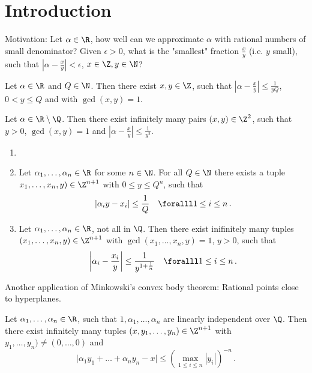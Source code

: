 \section{Introduction}

Motivation: Let \( \alpha \in \R \), how well can we approximate \( \alpha \) with rational numbers of small denominator?
Given \( \epsilon>0 \), what is the "smallest" fraction \( \frac{x}{y} \) (i.e. \( y \) small), such that \( \left| \alpha - \frac{x}{y} \right| < \epsilon \), \( x \in \Z, y \in \N \)?

\begin{thmn}[Dirichlet, 1842]
	Let \( \alpha \in \R \) and \( Q \in \N \).
	Then there exist \( x,y \in \Z \), such that \( \left| \alpha - \frac{x}{y} \right| \leq \frac{1}{yQ} \), \( 0 < y \leq Q \) and with \( \gcd(x,y) = 1 \).
\end{thmn}

\begin{cor}\label{thm:4.2}
	Let \( \alpha \in \R \setminus \Q \).
	Then there exist infinitely many pairs \( (x,y) \in \Z^2 \), such that \( y > 0 \), \( \gcd(x,y)=1 \) and \( \left| \alpha - \frac{x}{y} \right| \leq \frac{1}{y^2} \).
\end{cor}

\begin{thmn}[Dirichlet, 1842]
	\begin{enumerate}[label=(\alph*)]
		\item[]
		\item Let \( \alpha_1, \dotsc, \alpha_n \in \R \) for some \( n \in \N \).
			For all \( Q \in \N \) there exists a tuple \( x_1, \dotsc, x_n, y) \in \Z^{n+1} \) with \( 0 \leq y \leq Q^n \), such that
			\[ \left| \alpha_i y - x_i \right| \leq \frac{1}{Q} \quad \foralll 1 \leq i \leq n \,. \]
		\item Let \( \alpha_1, \dotsc, \alpha_n \in \R \), not all in \( \Q \).
			Then there exist inifinitely many tuples \( (x_1, \dotsc, x_n, y) \in \Z^{n+1} \) with \( \gcd(x_1, \dotsc, x_n, y) = 1 \), \( y>0 \), such that
			\[ \left| \alpha_i - \frac{x_i}{y} \right| \leq \frac{1}{y^{1 + \frac{1}{n}}} \quad \foralll 1 \leq i \leq n \,. \]
	\end{enumerate}
\end{thmn}

Another application of Minkowski's convex body theorem: Rational points close to hyperplanes.

\begin{thmn}
	Let \( \alpha_1, \dotsc, \alpha_n \in \R \), such that \( 1, \alpha_1, \dotsc, \alpha_n \) are linearly independent over \( \Q \).
	Then there exist infinitely many tuples \( (x, y_1, \dotsc, y_n) \in \Z^{n+1} \) with \( y_1, \dotsc, y_n) \neq (0, \dotsc, 0) \) and
	\[ \big| \alpha_1 y_1 + \dots + \alpha_n y_n - x \big| \leq \left( \max_{1 \leq i \leq n} |y_i| \right)^{-n} \,. \]
\end{thmn}

